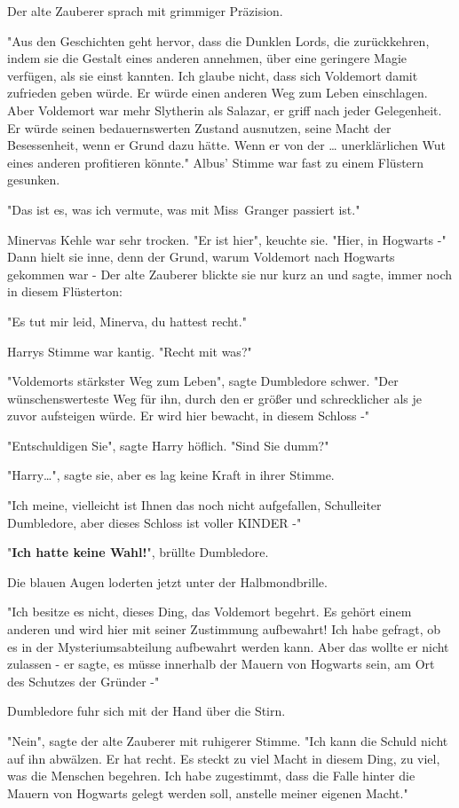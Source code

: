 {Der alte Zauberer sprach mit grimmiger Präzision.

"Aus den Geschichten geht hervor, dass die Dunklen Lords, die zurückkehren, indem sie die Gestalt eines anderen annehmen, über eine geringere Magie verfügen, als sie einst kannten. Ich glaube nicht, dass sich Voldemort damit zufrieden geben würde. Er würde einen anderen Weg zum Leben einschlagen. Aber Voldemort war mehr Slytherin als Salazar, er griff nach jeder Gelegenheit. Er würde seinen bedauernswerten Zustand ausnutzen, seine Macht der Besessenheit, wenn er Grund dazu hätte. Wenn er von der … unerklärlichen Wut eines anderen profitieren könnte." Albus' Stimme war fast zu einem Flüstern gesunken.

"Das ist es, was ich vermute, was mit Miss~Granger passiert ist."

Minervas Kehle war sehr trocken. "Er ist hier", keuchte sie. "Hier, in Hogwarts -" Dann hielt sie inne, denn der Grund, warum Voldemort nach Hogwarts gekommen war - Der alte Zauberer blickte sie nur kurz an und sagte, immer noch in diesem Flüsterton:

"Es tut mir leid, Minerva, du hattest recht."

Harrys Stimme war kantig. "Recht mit was?"

"Voldemorts stärkster Weg zum Leben", sagte Dumbledore schwer. "Der wünschenswerteste Weg für ihn, durch den er größer und schrecklicher als je zuvor aufsteigen würde. Er wird hier bewacht, in diesem Schloss -"

"Entschuldigen Sie", sagte Harry höflich. "Sind Sie dumm?"

"Harry…", sagte sie, aber es lag keine Kraft in ihrer Stimme.

"Ich meine, vielleicht ist Ihnen das noch nicht aufgefallen, Schulleiter Dumbledore, aber dieses Schloss ist voller KINDER -"

"\textbf{Ich hatte keine Wahl!}", brüllte Dumbledore.

Die blauen Augen loderten jetzt unter der Halbmondbrille.

"Ich besitze es nicht, dieses Ding, das Voldemort begehrt. Es gehört einem anderen und wird hier mit seiner Zustimmung aufbewahrt! Ich habe gefragt, ob es in der Mysteriumsabteilung aufbewahrt werden kann. Aber das wollte er nicht zulassen - er sagte, es müsse innerhalb der Mauern von Hogwarts sein, am Ort des Schutzes der Gründer -"

Dumbledore fuhr sich mit der Hand über die Stirn.

"Nein", sagte der alte Zauberer mit ruhigerer Stimme. "Ich kann die Schuld nicht auf ihn abwälzen. Er hat recht. Es steckt zu viel Macht in diesem Ding, zu viel, was die Menschen begehren. Ich habe zugestimmt, dass die Falle hinter die Mauern von Hogwarts gelegt werden soll, anstelle meiner eigenen Macht."

}
